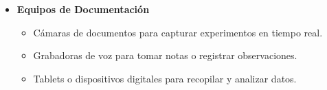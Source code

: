\begin{itemize}
  \item \textbf{Equipos de Documentación}
  \begin{itemize}
      \item Cámaras de documentos para capturar experimentos en tiempo real.
      \item Grabadoras de voz para tomar notas o registrar observaciones.
      \item Tablets o dispositivos digitales para recopilar y analizar datos.
  \end{itemize}
\end{itemize}